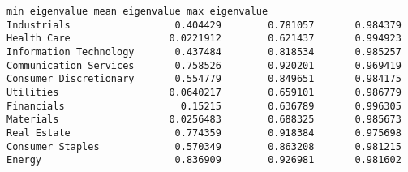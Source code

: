 \documentclass[11pt]{article}
\begin{document}
            \begin{tcolorbox}[breakable, size=fbox, boxrule=.5pt, pad at break*=1mm, opacityfill=0]
\begin{Verbatim}[commandchars=\\\{\}]
                       min eigenvalue mean eigenvalue max eigenvalue
Industrials                  0.404429        0.781057       0.984379
Health Care                 0.0221912        0.621437       0.994923
Information Technology       0.437484        0.818534       0.985257
Communication Services       0.758526        0.920201       0.969419
Consumer Discretionary       0.554779        0.849651       0.984175
Utilities                   0.0640217        0.659101       0.986779
Financials                    0.15215        0.636789       0.996305
Materials                   0.0256483        0.688325       0.985673
Real Estate                  0.774359        0.918384       0.975698
Consumer Staples             0.570349        0.863208       0.981215
Energy                       0.836909        0.926981       0.981602
\end{Verbatim}
\end{tcolorbox}
        

    
    
    
\end{document}
